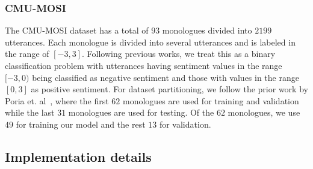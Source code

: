 \documentclass[lettersize,journal]{IEEEtran}
\begin{document}
\subsubsection{CMU-MOSI}
The CMU-MOSI dataset has a total of $93$ monologues divided into $2199$ utterances. Each monologue is divided into several utterances and is labeled in the range of $[-3, 3]$. Following previous works, we treat this as a binary classification problem with utterances having sentiment values in the range $[-3, 0)$ being classified as negative sentiment and those with values in the range $[0, 3]$ as positive sentiment. For dataset partitioning, we follow the prior work by Poria et. al~\cite{poria2017context}, where the first  $62$ monologues are used for training and validation while the last $31$ monologues are used for testing. Of the $62$ monologues, we use $49$ for training our model and the rest $13$ for validation.
\begin{table}[t!]
\centering
\caption{Results on the different datasets in terms of weighted F1-score.}\label{tab:results}
    \vspace{-0.0in}


\end{table}
\subsection{Implementation details}\label{implement}
\end{document}
